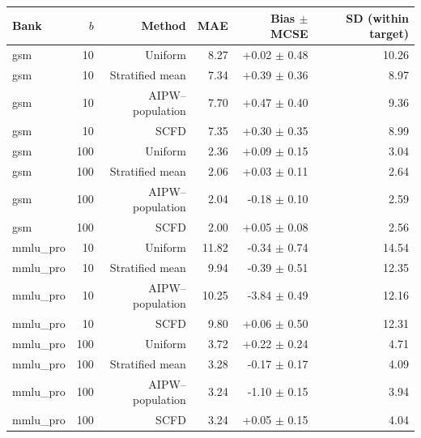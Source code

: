 \begin{tabular}{lrrrrr}
\toprule
Bank & $b$ & Method & MAE & Bias $\pm$ MCSE & SD (within target) \\
\midrule
gsm & 10 & Uniform & 8.27 & +0.02 $\pm$ 0.48 & 10.26 \\
gsm & 10 & Stratified mean & 7.34 & +0.39 $\pm$ 0.36 & 8.97 \\
gsm & 10 & AIPW--population & 7.70 & +0.47 $\pm$ 0.40 & 9.36 \\
gsm & 10 & SCFD & 7.35 & +0.30 $\pm$ 0.35 & 8.99 \\
gsm & 100 & Uniform & 2.36 & +0.09 $\pm$ 0.15 & 3.04 \\
gsm & 100 & Stratified mean & 2.06 & +0.03 $\pm$ 0.11 & 2.64 \\
gsm & 100 & AIPW--population & 2.04 & -0.18 $\pm$ 0.10 & 2.59 \\
gsm & 100 & SCFD & 2.00 & +0.05 $\pm$ 0.08 & 2.56 \\
mmlu\_pro & 10 & Uniform & 11.82 & -0.34 $\pm$ 0.74 & 14.54 \\
mmlu\_pro & 10 & Stratified mean & 9.94 & -0.39 $\pm$ 0.51 & 12.35 \\
mmlu\_pro & 10 & AIPW--population & 10.25 & -3.84 $\pm$ 0.49 & 12.16 \\
mmlu\_pro & 10 & SCFD & 9.80 & +0.06 $\pm$ 0.50 & 12.31 \\
mmlu\_pro & 100 & Uniform & 3.72 & +0.22 $\pm$ 0.24 & 4.71 \\
mmlu\_pro & 100 & Stratified mean & 3.28 & -0.17 $\pm$ 0.17 & 4.09 \\
mmlu\_pro & 100 & AIPW--population & 3.24 & -1.10 $\pm$ 0.15 & 3.94 \\
mmlu\_pro & 100 & SCFD & 3.24 & +0.05 $\pm$ 0.15 & 4.04 \\
\bottomrule
\end{tabular}
